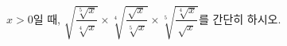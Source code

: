 $x>0$일 때, $\sqrt{\dfrac{\sqrt[5]{x}}{\sqrt[4]{x}}}\times\sqrt[4]{\dfrac{\sqrt{x}}{\sqrt[5]{x}}}\times\sqrt[5]{\dfrac{\sqrt[4]{x}}{\sqrt{x}}}$를 간단히 하시오.
